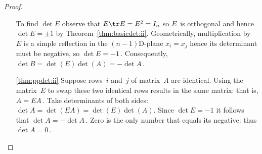 \begin{proof}
\begin{itemize}
To find \(\det E\) observe that \(E\tr E=E^2=I_n\) so \(E\)~is orthogonal and hence \(\det E=\pm 1\) by Theorem~\ref{thm:basicdet:ii}.
Geometrically, multiplication by~\(E\) is a simple reflection in the $(n-1)$D-plane \(x_i=x_j\) hence its determinant must be negative, so \(\det E=-1\)\,.
Consequently, \(\det B=\det(E)\det(A)=-\det A\)\,.

\item[\ref{thm:ppdet:ii}]
Suppose rows~\(i\) and~\(j\) of matrix~\(A\) are identical.
Using the matrix~\(E\) to swap these two identical rows results in the same matrix: that is, \(A=EA\)\,.
Take determinants of both sides: \(\det A=\det(EA)=\det(E)\det(A)\).
Since \(\det E=-1\) it follows that \(\det A=-\det A\)\,.
Zero is the only number that equals its negative: thus \(\det A=0\)\,.
\end{itemize}
\end{proof}





